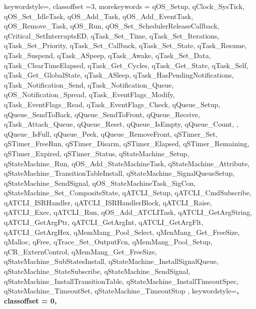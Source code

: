{    keywordstyle=\color{teal},    
    classoffset =3,
    morekeywords = {qOS_Setup, qClock_SysTick, qOS_Set_IdleTask, qOS_Add_Task, qOS_Add_EventTask, qOS_Remove_Task, qOS_Run, qOS_Set_SchedulerReleaseCallback, qCritical_SetInterruptsED, qTask_Set_Time, qTask_Set_Iterations, qTask_Set_Priority, qTask_Set_Callback, qTask_Set_State, qTask_Resume, qTask_Suspend, qTask_ASpeep, qTask_Awake, qTask_Set_Data, qTask_ClearTimeElapsed, qTask_Get_Cycles, qTask_Get_State, qTask_Self, qTask_Get_GlobalState, qTask_ASleep, qTask_HasPendingNotifications, qTask_Notification_Send, qTask_Notification_Queue, qOS_Notification_Spread, qTask_EventFlags_Modify, qTask_EventFlags_Read, qTask_EventFlags_Check, qQueue_Setup, qQueue_SendToBack, qQueue_SendToFront, qQueue_Receive, qTask_Attach_Queue, qQueue_Reset, qQueue_IsEmpty, qQueue_Count, , qQueue_IsFull, qQueue_Peek, qQueue_RemoveFront, qSTimer_Set, qSTimer_FreeRun, qSTimer_Disarm, qSTimer_Elapsed, qSTimer_Remaining, qSTimer_Expired, qSTimer_Status, qStateMachine_Setup, qStateMachine_Run, qOS_Add_StateMachineTask, qStateMachine_Attribute, qStateMachine_TransitionTableInstall, qStateMachine_SignalQueueSetup, qStateMachine_SendSignal, qOS_StateMachineTask_SigCon, qStateMachine_Set_CompositeState, qATCLI_Setup, qATCLI_CmdSubscribe, qATCLI_ISRHandler, qATCLI_ISRHandlerBlock, qATCLI_Raise, qATCLI_Exec, qATCLI_Run, qOS_Add_ATCLITask, qATCLI_GetArgString, qATCLI_GetArgPtr, qATCLI_GetArgInt, qATCLI_GetArgFlt, qATCLI_GetArgHex, qMemMang_Pool_Select, qMenMang_Get_FreeSize, qMalloc, qFree, qTrace_Set_OutputFcn, qMemMang_Pool_Setup, qCR_ExternControl, qMemMang_Get_FreeSize, qStateMachine_SubStatesInstall, qStateMachine_InstallSignalQueue, qStateMachine_StateSubscribe, qStateMachine_SendSignal, qStateMachine_InstallTransitionTable, qStateMachine_InstallTimeoutSpec, qStateMachine_TimeoutSet, qStateMachine_TimeoutStop },
    keywordstyle=\bfseries,
    classoffset = 0,
}